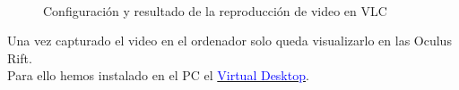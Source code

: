 \documentclass[twoside, 11pt]{epstfg}
\begin{document}
\begin{figure}[H]
	\centering
	\\
		\caption{Configuración y resultado de la reproducción de video en VLC} \label{figstream}
\end{figure}

Una vez capturado el video en el ordenador solo queda visualizarlo en las Oculus Rift.\\
Para ello hemos instalado en el PC el \href{http://store.steampowered.com/app/382110/}{\textcolor{blue}{Virtual Desktop}}. 
\end{document}
